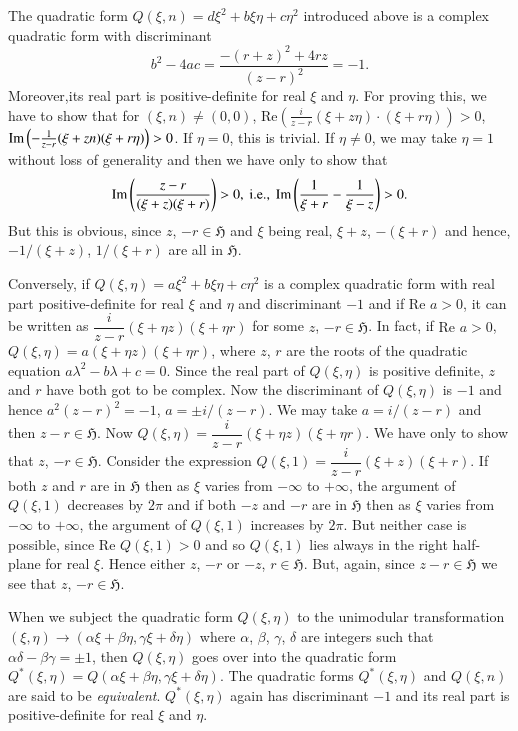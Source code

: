 The quadratic form $Q(\xi,n)=d\xi^{2}+b\xi\eta+c\eta^{2}$ introduced
above is a complex quadratic form with discriminant
$$
b^{2}-4ac=\frac{-(r+z)^{2}+4rz}{(z-r)^{2}}=-1.
$$
Moreover,\pageoriginale its real part is positive-definite for real
$\xi$ and $\eta$. For proving this, we have to show that for
$(\xi,n)\neq (0,0)$, $\text{Re}\left(\frac{i}{z-r}(\xi+z\eta)\cdot
(\xi+r\eta)\right)>0$, \ie
$\operatorname{Im}\left(-\frac{1}{z-r}(\xi+zn)(\xi+r\eta)\right)>0$. If $\eta=0$,
this is trivial. If $\eta\neq 0$, we may take $\eta=1$ without loss of
generality and then we have only to show that
$$
\operatorname{Im} \left(\frac{z-r}{(\xi+z)(\xi+r)}\right)>0,\text{ i.e., }
\operatorname{Im}\left(\frac{1}{\xi+r}-\frac{1}{\xi-z}\right)>0.
$$
But this is obvious, since $z$, $-r\in \mathfrak{H}$ and $\xi$ being
real, $\xi+z$, $-(\xi+r)$ and hence, $-1/(\xi+z)$, $1/(\xi+r)$ are all
in $\mathfrak{H}$. 

Conversely, if $Q(\xi,\eta)=a\xi^{2}+b\xi\eta+c\eta^{2}$ is a complex
quadratic form with real part positive-definite for real $\xi$ and
$\eta$ and discriminant $-1$ and if $\text{Re }a>0$, it can be written
as $\dfrac{i}{z-r}(\xi+\eta z)(\xi +\eta r)$ for some $z$,
$-r\in\mathfrak{H}$. In fact, if $\text{Re }a>0$,
$Q(\xi,\eta)=a(\xi+\eta z)(\xi+\eta r)$, where $z$, $r$ are the roots
of the quadratic equation $a\lambda^{2}-b\lambda+c=0$. Since the real
part of $Q(\xi,\eta)$ is positive definite, $z$ and $r$ have both got
to be complex. Now the discriminant of $Q(\xi,\eta)$ is $-1$ and hence
$a^{2}(z-r)^{2}=-1$, \ie $a=\pm i/(z-r)$. We may take $a=i/(z-r)$ and
then $z-r\in \mathfrak{H}$. Now $Q(\xi,\eta)=\dfrac{i}{z-r}(\xi+\eta
z)(\xi+\eta r)$. We have only to show that $z$, $-r\in
\mathfrak{H}$. Consider the expression
$Q(\xi,1)=\dfrac{i}{z-r}(\xi+z)(\xi+r)$. If both $z$ and $r$ are in
$\mathfrak{H}$ then as $\xi$ varies from $-\infty$ to $+\infty$, the
argument of $Q(\xi,1)$ decreases by $2\pi$ and if both $-z$ and $-r$
are in $\mathfrak{H}$ then as $\xi$ varies from $-\infty$ to
$+\infty$, the argument of $Q(\xi,1)$ increases by $2\pi$. But neither
case is possible, since $\text{Re }Q(\xi,1)>0$ and so $Q(\xi,1)$ lies
always in the right half-plane for real $\xi$. Hence either $z$, $-r$
or $-z$, $r\in \mathfrak{H}$. But, again, since $z-r\in\mathfrak{H}$
we see that $z$, $-r\in\mathfrak{H}$. 

When we subject the quadratic form $Q(\xi,\eta)$ to the unimodular
transformation $(\xi,\eta)\to
(\alpha\xi+\beta\eta,\gamma\xi+\delta\eta)$ where $\alpha$, $\beta$,
$\gamma$, $\delta$ are integers such that
$\alpha\delta-\beta\gamma=\pm 1$, then $Q(\xi,\eta)$ goes over into
the quadratic form
$Q^{\ast}(\xi,\eta)=Q(\alpha\xi+\beta\eta,\gamma\xi+\delta\eta)$. The
quadratic forms $Q^{\ast}(\xi,\eta)$ and $Q(\xi,n)$ are said to be
{\em equivalent}. $Q^{\ast}(\xi,\eta)$ again has discriminant $-1$ and
its real part is positive-definite for real $\xi$ and $\eta$.

